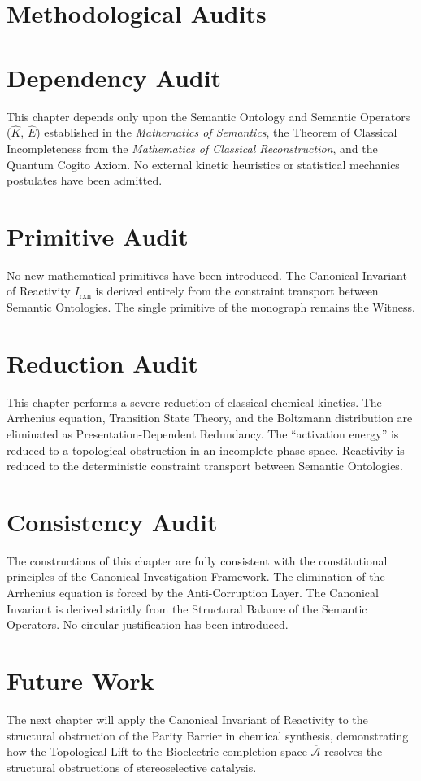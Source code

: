 \documentclass[11pt,openany]{extbook}
\newenvironment{dependencyaudit}{\section*{Dependency Audit}}{}
\newenvironment{primitiveaudit}{\section*{Primitive Audit}}{}
\newenvironment{reductionaudit}{\section*{Reduction Audit}}{}
\newenvironment{consistencyaudit}{\section*{Consistency Audit}}{}
\newenvironment{futurework}{\section*{Future Work}}{}
\theoremstyle{plain}
\theoremstyle{definition}
\begin{document}
\section{Methodological Audits}

\begin{dependencyaudit}
This chapter depends only upon the Semantic Ontology and Semantic Operators ($\hat{K}$, $\hat{E}$) established in the \emph{Mathematics of Semantics}, the Theorem of Classical Incompleteness from the \emph{Mathematics of Classical Reconstruction}, and the Quantum Cogito Axiom. No external kinetic heuristics or statistical mechanics postulates have been admitted.
\end{dependencyaudit}

\begin{primitiveaudit}
No new mathematical primitives have been introduced. The Canonical Invariant of Reactivity $I_{\mathrm{rxn}}$ is derived entirely from the constraint transport between Semantic Ontologies. The single primitive of the monograph remains the Witness.
\end{primitiveaudit}

\begin{reductionaudit}
This chapter performs a severe reduction of classical chemical kinetics. The Arrhenius equation, Transition State Theory, and the Boltzmann distribution are eliminated as Presentation-Dependent Redundancy. The ``activation energy'' is reduced to a topological obstruction in an incomplete phase space. Reactivity is reduced to the deterministic constraint transport between Semantic Ontologies.
\end{reductionaudit}

\begin{consistencyaudit}
The constructions of this chapter are fully consistent with the constitutional principles of the Canonical Investigation Framework. The elimination of the Arrhenius equation is forced by the Anti-Corruption Layer. The Canonical Invariant is derived strictly from the Structural Balance of the Semantic Operators. No circular justification has been introduced.
\end{consistencyaudit}

\begin{futurework}
The next chapter will apply the Canonical Invariant of Reactivity to the structural obstruction of the Parity Barrier in chemical synthesis, demonstrating how the Topological Lift to the Bioelectric completion space $\overline{\mathcal{A}}$ resolves the structural obstructions of stereoselective catalysis.
\end{futurework}
\end{document}
